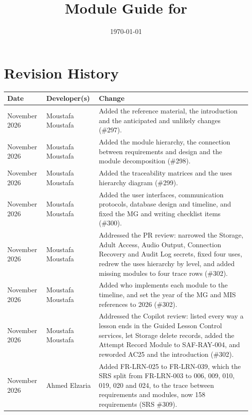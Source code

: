 \documentclass[12pt, titlepage]{article}
\begin{document}
\title{Module Guide for \progname{}} 
\author{\authname}
\date{\today}

\maketitle


\section{Revision History}

\begin{tabularx}{\textwidth}{>{\raggedright\arraybackslash}p{3cm}
>{\raggedright\arraybackslash}p{3.3cm}>{\raggedright\arraybackslash}X}
\toprule \textbf{Date} & \textbf{Developer(s)} & \textbf{Change}\\
\midrule
9 November 2026 & Moustafa Moustafa & Added the reference material, the
introduction and the anticipated and unlikely changes (\#297).\\
9 November 2026 & Moustafa Moustafa & Added the module hierarchy, the
connection between requirements and design and the module decomposition
(\#298).\\
9 November 2026 & Moustafa Moustafa & Added the traceability matrices and the
uses hierarchy diagram (\#299).\\
9 November 2026 & Moustafa Moustafa & Added the user interfaces,
communication protocols, database design and timeline, and fixed the MG and
writing checklist items (\#300).\\
9 November 2026 & Moustafa Moustafa & Addressed the PR review: narrowed the
Storage, Adult Access, Audio Output, Connection Recovery and Audit Log secrets,
fixed four uses, redrew the uses hierarchy by level, and added missing modules
to four trace rows (\#302).\\
10 November 2026 & Moustafa Moustafa & Added who implements each module to the
timeline, and set the year of the MG and MIS references to 2026 (\#302).\\
10 November 2026 & Moustafa Moustafa & Addressed the Copilot review: listed
every way a lesson ends in the Guided Lesson Control services, let Storage
delete records, added the Attempt Record Module to SAF-RAY-004, and reworded
AC25 and the introduction (\#302).\\
11 November 2026 & Ahmed Elzaria & Added FR-LRN-025 to FR-LRN-039, which
the SRS split from FR-LRN-003 to 006, 009, 010, 019, 020 and 024, to the
trace between requirements and modules, now 158 requirements (SRS \#309).\\

\end{tabularx}
\end{document}
